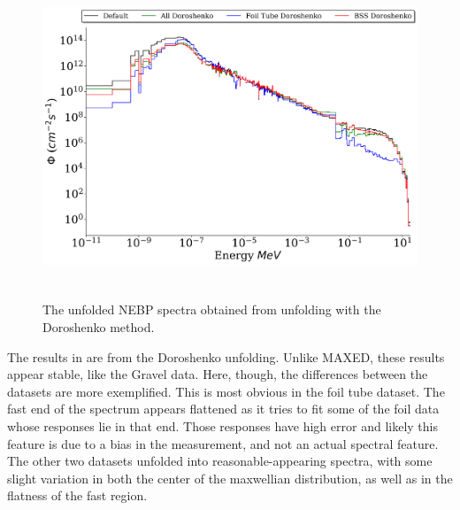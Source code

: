 \begin{figure}[htb]
\includegraphics[height=3.8in]{tex/figures/unfolded_do.png}
\caption[Doroshenko Unfolded Spectra]{The unfolded NEBP spectra obtained from unfolding with the Doroshenko method.}
\label{fig:unfolded_do}
\end{figure}

The results in  are from the Doroshenko unfolding.
Unlike MAXED, these results appear stable, like the Gravel data.
Here, though, the differences between the datasets are more exemplified.
This is most obvious in the foil tube dataset.
The fast end of the spectrum appears flattened as it tries to fit some of the foil data whose responses lie in that end.
Those responses have high error and likely this feature is due to a bias in the measurement, and not an actual spectral feature.
The other two datasets unfolded into reasonable-appearing spectra, with some slight variation in both the center of the maxwellian distribution, as well as in the flatness of the fast region.


